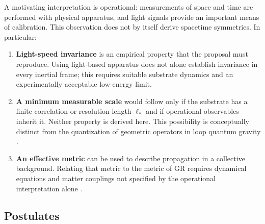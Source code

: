 \documentclass[11pt,a4paper]{article}
\begin{document}
A motivating interpretation is operational: measurements of space and time are performed with
physical apparatus, and light signals provide an important means of calibration. This observation
does not by itself derive spacetime symmetries. In particular:
\begin{enumerate}
\item \textbf{Light-speed invariance} is an empirical property that the proposal must reproduce.
Using light-based apparatus does not alone establish invariance in every inertial frame; this
requires suitable substrate dynamics and an experimentally acceptable low-energy limit.
\item \textbf{A minimum measurable scale} would follow only if the substrate has a finite
correlation or resolution length $\ell_\ast$ and if operational observables inherit it. Neither
property is derived here. This possibility is conceptually distinct from the quantization of
geometric operators in loop quantum gravity \cite{Rovelli2015}.
\item \textbf{An effective metric} can be used to describe propagation in a collective background.
Relating that metric to the metric of GR requires dynamical equations and matter couplings not
specified by the operational interpretation alone \cite{Volovik2003,Donoghue1994}.
\end{enumerate}

\subsection{Postulates}
\end{document}
